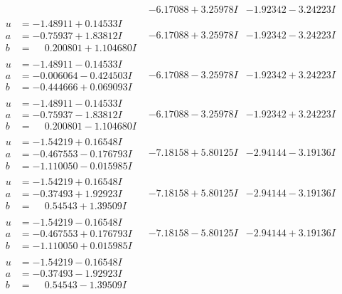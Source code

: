 \documentclass[1p]{elsarticle_modified}
\theoremstyle{definition}
\begin{document}
$$\begin{array}{c|c|c}
 & -6.17088 + 3.25978 I & -1.92342 - 3.24223 I \\ \hline\begin{aligned}
u &= -1.48911 + 0.14533 I \\
a &= -0.75937 + 1.83812 I \\
b &= \phantom{-}0.200801 + 1.104680 I\end{aligned}
 & -6.17088 + 3.25978 I & -1.92342 - 3.24223 I \\ \hline\begin{aligned}
u &= -1.48911 - 0.14533 I \\
a &= -0.006064 - 0.424503 I \\
b &= -0.444666 + 0.069093 I\end{aligned}
 & -6.17088 - 3.25978 I & -1.92342 + 3.24223 I \\ \hline\begin{aligned}
u &= -1.48911 - 0.14533 I \\
a &= -0.75937 - 1.83812 I \\
b &= \phantom{-}0.200801 - 1.104680 I\end{aligned}
 & -6.17088 - 3.25978 I & -1.92342 + 3.24223 I \\ \hline\begin{aligned}
u &= -1.54219 + 0.16548 I \\
a &= -0.467553 - 0.176793 I \\
b &= -1.110050 - 0.015985 I\end{aligned}
 & -7.18158 + 5.80125 I & -2.94144 - 3.19136 I \\ \hline\begin{aligned}
u &= -1.54219 + 0.16548 I \\
a &= -0.37493 + 1.92923 I \\
b &= \phantom{-}0.54543 + 1.39509 I\end{aligned}
 & -7.18158 + 5.80125 I & -2.94144 - 3.19136 I \\ \hline\begin{aligned}
u &= -1.54219 - 0.16548 I \\
a &= -0.467553 + 0.176793 I \\
b &= -1.110050 + 0.015985 I\end{aligned}
 & -7.18158 - 5.80125 I & -2.94144 + 3.19136 I \\ \hline\begin{aligned}
u &= -1.54219 - 0.16548 I \\
a &= -0.37493 - 1.92923 I \\
b &= \phantom{-}0.54543 - 1.39509 I\end{aligned}

\end{array}$$
\end{document}
